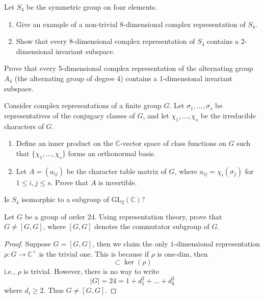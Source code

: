 \begin{prob}[S2006-Q6]
    Let \( S_4 \) be the symmetric group on four elements.
    
    \begin{enumerate}
        \item Give an example of a non-trivial 8-dimensional complex representation of \( S_4 \).
        
        \item Show that every 8-dimensional complex representation of \( S_4 \) contains a 2-dimensional invariant subspace.
    \end{enumerate}
\end{prob}

\begin{prob}[F2007-Q5]
    Prove that every 5-dimensional complex representation of the alternating group \( A_4 \) (the alternating group of degree 4) contains a 1-dimensional invariant subspace.
\end{prob}

\begin{prob}[S2004-Q6]
    Consider complex representations of a finite group \( G \). Let \( \sigma_1, \ldots, \sigma_s \) be representatives of the conjugacy classes of \( G \), and let \( \chi_1, \ldots, \chi_s \) be the irreducible characters of \( G \).
    
    \begin{enumerate}
        \item Define an inner product on the \(\mathbb{C}\)-vector space of class functions on \( G \) such that \( \{\chi_1, \ldots, \chi_s\} \) forms an orthonormal basis.
        
        \item Let \( A = (a_{ij}) \) be the character table matrix of \( G \), where \( a_{ij} = \chi_i(\sigma_j) \) for \( 1 \leq i, j \leq s \). Prove that \( A \) is invertible.
    \end{enumerate}
\end{prob}

\begin{prob}[S2018-Q4, S2007-Q5]
    Is $S_4$ isomorphic to a subgroup of $\text{GL}_2(\mathbb{C})$?
\end{prob}

\begin{prob}[S2010-Q6]
    Let \( G \) be a group of order 24. Using representation theory, prove that \( G \neq [G, G] \), where \([G, G]\) denotes the commutator subgroup of \( G \).
\end{prob}
\begin{proof}
    Suppose $G=[G,G]$, then we claim the only $1$-dimensional representation $\rho:G\to\mathbb{C}^\times$ is the trivial one. This is because if $\rho$ is one-dim, then
    \begin{equation*}
        [G,G]\subset\ker(\rho)
    \end{equation*}
    i.e., $\rho$ is trivial. However, there is no way to write 
    \begin{equation*}
        |G|=24=1+d_1^2+\dots+d_k^2
    \end{equation*}
    where $d_i\geq 2$. Thus $G\neq [G,G]$.
\end{proof}

